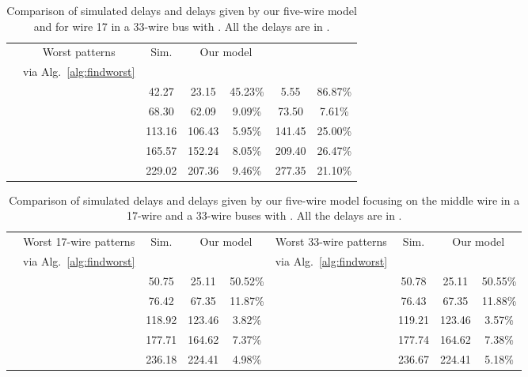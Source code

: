 \documentclass[10pt,journal]{IEEEtran}
\begin{document}
\begin{table*}
\caption{Comparison of simulated delays and delays given by our five-wire model and \cite{Sot01} for wire 17 in a 33-wire bus with  . All the delays are in .}\label{tab:6}
\begin{center}
\begin{tabular}{|c|c|c|c|c|c|c|}
\hline
\multirow{2}{*}{} & Worst patterns & Sim. & \multicolumn{2}{c|}{Our model} & \multicolumn{2}{c|}{\cite{Sot01}} \\
\cline{3-7}
& via Alg.~\ref{alg:findworst} &  &  &  &  &   \\
\hline
 &  & 42.27 &  23.15 & 45.23\% & 5.55  & 86.87\% \\
\hline
 &  & 68.30 & 62.09 & 9.09\% & 73.50  & 7.61\% \\
\hline
 &  & 113.16 & 106.43 &  5.95\% & 141.45 & 25.00\% \\
\hline
 &  & 165.57 & 152.24 &  8.05\% & 209.40 & 26.47\% \\
\hline
 &   & 229.02 & 207.36 & 9.46\% & 277.35 & 21.10\% \\
\hline
\end{tabular}
\end{center}
\end{table*}


\begin{table*}
\caption{Comparison of simulated delays and delays given by our five-wire model focusing on the middle wire in a 17-wire and a 33-wire buses with  . All the delays are in .}\label{tab:100fF}
\begin{center}
\begin{tabular}{|c|c|c|c|c|c|c|c|c|}
\hline
\multirow{2}{*}{}& Worst 17-wire patterns & Sim. & \multicolumn{2}{c|}{Our model} & Worst 33-wire patterns & Sim. & \multicolumn{2}{c|}{Our model} \\
\cline{3-5}\cline{7-9}
& via Alg.~\ref{alg:findworst} &  &  &  & via Alg.~\ref{alg:findworst} &  &  & \\
\hline
 &  & 50.75 &  25.11 & 50.52\% &  & 50.78 &  25.11 & 50.55\% \\
\hline
 &  & 76.42 & 67.35 & 11.87\% &  & 76.43 & 67.35 & 11.88\% \\
\hline
 &  & 118.92 & 123.46 &  3.82\% &  & 119.21 & 123.46 &  3.57\% \\
\hline
 &  & 177.71 & 164.62 &  7.37\% &  & 177.74 & 164.62 &  7.38\% \\
\hline
 &  & 236.18 & 224.41 & 4.98\% &   & 236.67 & 224.41 & 5.18\% \\
\hline
\end{tabular}
\end{center}
\end{table*}
\end{document}
